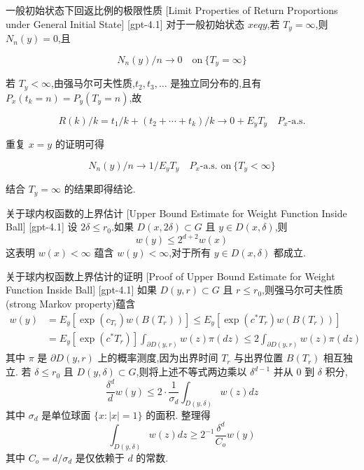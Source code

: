 \documentclass[UTF8]{ctexart}
\begin{document}
    
    
    \begin{thm}
        {一般初始状态下回返比例的极限性质}
        [Limit Properties of Return Proportions under General Initial State]
        [gpt-4.1]
        对于一般初始状态 $x 
eq y$,若 $T_y = \infty$,则 $N_n(y) = 0$,且

\[
N_n(y) / n \to 0 \quad \text{on} \ \{ T_y = \infty \}
\]

若 $T_y < \infty$,由强马尔可夫性质,$t_2, t_3, \ldots$ 是独立同分布的,且有 $P_x(t_k = n) = P_y(T_y = n)$,故

\[
R(k) / k = t_1 / k + (t_2 + \cdots + t_k) / k \to 0 + E_y T_y \quad P_x\text{-a.s.}
\]

重复 $x = y$ 的证明可得

\[
N_n(y) / n \to 1 / E_y T_y \quad P_x\text{-a.s. on} \ \{ T_y < \infty \}
\]

结合 $T_y = \infty$ 的结果即得结论.
    \end{thm}
    
    
    
    \begin{lma}
        {关于球内权函数的上界估计}
        [Upper Bound Estimate for Weight Function Inside Ball]
        [gpt-4.1]
        设 $2\delta \leq r_{0}$.如果 $D(x, 2\delta) \subset G$ 且 $y \in D(x, \delta)$,则
\[
w(y) \leq 2^{d+2} w(x)
\]
这表明 $w(x) < \infty$ 蕴含 $w(y) < \infty$,对于所有 $y \in D(x, \delta)$ 都成立.
    \end{lma}
    
    
    
    \begin{prf}
        {关于球内权函数上界估计的证明}
        [Proof of Upper Bound Estimate for Weight Function Inside Ball]
        [gpt-4.1]
        如果 $D(y, r) \subset G$ 且 $r \leq r_{0}$,则强马尔可夫性质(strong Markov property)蕴含
\[
\begin{aligned}
w(y) &= E_{y} [ \exp( c_{T_{r}} ) w( B( T_{r} ) ) ] \leq E_{y} [ \exp( c^{*} T_{r} ) w( B( T_{r} ) ) ] \\
&= E_{y} [ \exp( c^{*} T_{r} ) ] \int_{ \partial D(y, r) } w(z) \pi(dz) \leq 2 \int_{ \partial D(y, r) } w(z) \pi(dz)
\end{aligned}
\]
其中 $\pi$ 是 $\partial D(y, r)$ 上的概率测度,因为出界时间 $T_{r}$ 与出界位置 $B(T_{r})$ 相互独立.
若 $\delta \leq r_{0}$ 且 $D(y, \delta) \subset G$,则将上述不等式两边乘以 $\delta^{d-1}$ 并从 $0$ 到 $\delta$ 积分,
\[
\frac{ \delta^{d} }{ d } w(y) \leq 2 \cdot \frac{1}{ \sigma_{d} } \int_{ D(y, \delta) } w(z) dz
\]
其中 $\sigma_{d}$ 是单位球面 $\{ x : |x| = 1 \}$ 的面积.
整理得
\[
\int_{ D(y, \delta) } w(z) dz \geq 2^{-1} \frac{ \delta^{d} }{ C_{o} } w(y)
\]
其中 $C_{o} = d / \sigma_{d}$ 是仅依赖于 $d$ 的常数.
    \end{prf}
    
\end{document}
